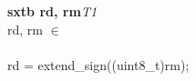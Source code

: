 


\begin{instructionblock}{\imagewidth}%
    \textbf{sxtb rd, rm}\hfill\textit{T1}\\
    rd, rm $\in$ \baseregisters\\
    {}\\
    rd = extend\_sign((uint8\_t)rm);
\end{instructionblock}

